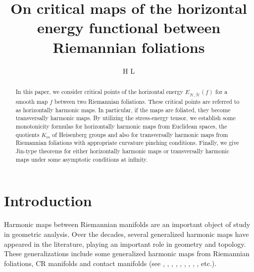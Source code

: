 \documentclass[12pt,reqno]{amsart}
\theoremstyle{definition}
\def\HH{{\mathcal{H},\widetilde{\mathcal{H}}}}
\begin{document}
    \begin{abstract}
        In this paper, we consider critical points of the
        horizontal energy $E_{\HH}(f)$ for a smooth map $f$ between two Riemannian
        foliations. These critical points are referred to as horizontally harmonic
        maps. In particular, if the maps are foliated, they become transversally
        harmonic maps. By utilizing the stress-energy tensor, we establish some
        monotonicity formulas for horizontally harmonic maps from Euclidean spaces,
        the quotients $K_{m}$ of Heisenberg groups and also for transversally
        harmonic maps from Riemannian foliations with appropriate curvature pinching
        conditions. Finally, we give Jin-type theorems for either horizontally
        harmonic maps or transversally harmonic maps under some asymptotic
        conditions at infinity.
\end{abstract} %


    
    \title[Horizontal maps between Riemannian foliations]{On critical maps of the horizontal energy functional between Riemannian foliations}

    
    \author{H L}
    \address{Scho a}
    \maketitle
    
    \let\thefootnote\relax

  
\section{Introduction}

    Harmonic maps between Riemannian manifolds are an important object of study in
	geometric analysis. Over the decades, several generalized harmonic maps have
	appeared in the literature, playing an important role in geometry and
	topology. These generalizations include some generalized harmonic maps from
	Riemannian foliations, CR manifolds and contact manifolds (see \cite{konderakREMARKSTRANSVERSALLYHARMONIC2008, konderakTransversallyHarmonicMaps2003}, \cite{chenBochnertypeFormulasTransversally2012a}, 
	\cite{dragomirHarmonicMapsFoliated2013a},
	\cite{barlettaTransversallyHolomorphicMaps1998a}, \cite{barlettaPseudoharmonicMapsNondegenerate2001},
	\cite{petitMokSiuYeungTypeFormulas2009},
	\cite{dragomirLeviHarmonicMaps2014},
	\cite{renPseudoharmonicMapsClosed2018}, \cite{chongHARMONICPSEUDOHARMONICMAPS2019},
	etc.).
	
\end{document}
